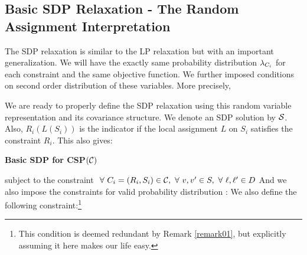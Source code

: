 \subsection{Basic SDP Relaxation - The Random Assignment Interpretation}

The SDP relaxation is similar to the LP relaxation but with an important generalization. 
We will have the exactly same probability distribution $\lambda_{C_i}$ for each constraint and the same objective function. 
We further imposed conditions on second order distribution of these variables. 
More precisely,

We are ready to properly define the SDP relaxation using this random variable representation and its covariance structure.  
We denote an SDP solution by $\mathcal{S}$. Also, $R_i(L(S_i))$ is the indicator if the local assignment $L$ on $S_i$ satisfies the constraint $R_i$. This also gives: 
\begin{definition}{\label{def1}}
{\bf Basic SDP for CSP$(\mathcal{C})$}  

subject to the constraint $\ \forall \  C_i = (R_i, S_i) \in \mathcal{C},\ \forall \  v, v' \in S, \ \forall \  \ell, \ell' \in D $
And we also impose the constraints for valid probability distribution : 
We also define the following constraint:\footnote{This condition is deemed redundant by Remark \ref{remark01}, but explicitly assuming it here makes our life easy.} 
\end{definition}

